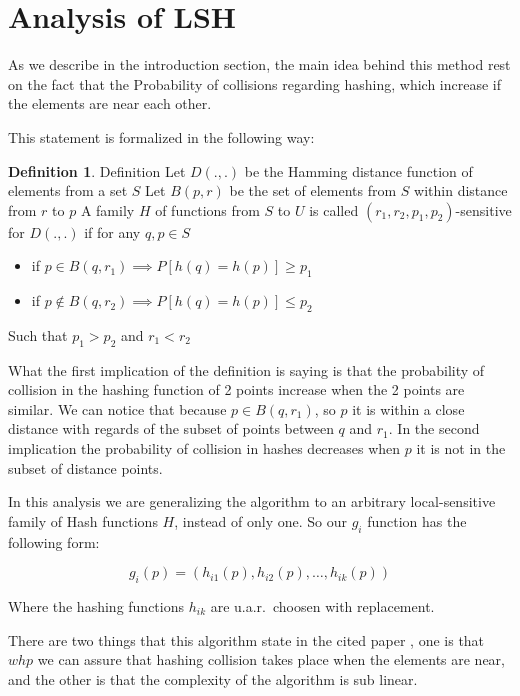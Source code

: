 \documentclass[12pt, a4paper]{article}
\theoremstyle{definition}
\begin{document}
\section{Analysis of LSH}
As we describe in the introduction section, the main idea behind this method rest on the fact that the Probability of collisions regarding hashing, which increase if the elements are near each other.

This statement is formalized in the following way:

\newtheorem*{prob}{Definition}
\begin{prob}{Definition}
  Let $D(.,.)$ be the Hamming distance function of elements from a set $S$
  Let $B(p,r)$ be the set of elements from $S$ within distance from $r$ to $p$
  A family $H$ of functions from $S$ to $U$ is called $(r_1, r_2, p_1, p_2)$-sensitive for $D(.,.)$ if for any $q, p \in S$
  \begin{itemize}
    \item if $p \in B(q,r_1) \implies P[h(q) = h(p)] \geq p_1$
    \item if $p \notin B(q,r_2) \implies P[h(q) = h(p)] \leq p_2$
  \end{itemize}
  Such that $p_1 > p_2$ and $r_1 < r_2$
\end{prob}

What the first implication of the definition is saying is that the probability of collision in the hashing function of 2 points increase when the 2 points are similar. We can notice that because $p \in B(q,r_1)$, so $p$ it is within a close distance with regards of the subset of points between $q$ and $r_1$. In the second implication the probability of collision in hashes decreases when $p$ it is not in the subset of distance points.

In this analysis we are generalizing the algorithm to an arbitrary local-sensitive family of Hash functions $H$, instead of only one. So our $g_i$ function has the following form:

\begin{equation*}
  g_i(p) = (h_{i1}(p), h_{i2}(p), \dots, h_{ik}(p))
\end{equation*}

Where the hashing functions $h_{ik}$ are u.a.r.\ choosen with replacement.

There are two things that this algorithm state in the cited paper \cite{gionis_sim_search}, one is that $whp$ we can assure that hashing collision takes place when the elements are near, and the other is that the complexity of the algorithm is sub linear.
\end{document}
